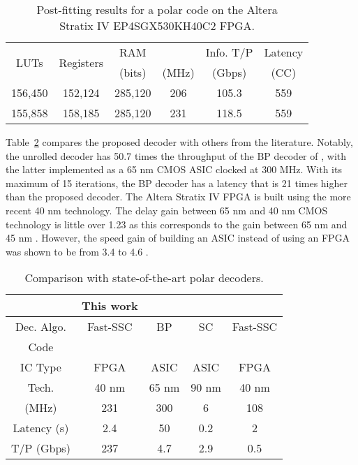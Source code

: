 \documentclass[letterpaper,onecolumn,journal,12pt]{IEEEtran}
\begin{document}
\begin{table}[h]
  \centering
  \caption{Post-fitting results for a  polar code on the Altera\\ Stratix IV EP4SGX530KH40C2 FPGA.}
  \begin{tabular}{c c c c c c}
    \toprule
    \multicolumn{1}{c}{\multirow{2}{*}{LUTs}} & \multicolumn{1}{c}{\multirow{2}{*}{Registers}} & \multicolumn{1}{c}{RAM} &  & Info. T/P & Latency\\
    & & \multicolumn{1}{c}{(bits)} & (MHz) & (Gbps) & (CC)\\
    \midrule
    156,450 & 152,124 & 285,120 & 206 & 105.3 & 559\\
    155,858 & 158,185 & 285,120 & 231 & 118.5 & 559\\
    \bottomrule
  \end{tabular}
  \label{tab:unrolled_results}
\end{table}

Table~\ref{tab:cmp_results} compares the proposed decoder with others from the literature. Notably, the unrolled decoder has 50.7 times the throughput of the BP decoder of \cite{Park2014}, with the latter implemented as a 65 nm CMOS ASIC clocked at 300 MHz. With its maximum of 15 iterations, the BP decoder has a latency that is 21 times higher than the proposed decoder. The Altera Stratix IV FPGA is built using the more recent 40 nm technology. The delay gain between 65 nm and 40 nm CMOS technology is little over 1.23 as this corresponds to the gain between 65 nm and 45 nm \cite{Wong2011}. However, the speed gain of building an ASIC instead of using an FPGA was shown to be from 3.4 to 4.6 \cite{Kuon2007}.

\begin{table}[h]
  \centering
  \caption{Comparison with state-of-the-art polar decoders.}
  \begin{tabular}{c c c c c}
    \toprule
                 & This work & \cite{Park2014} & \cite{Dizdar2014} & \cite{Sarkis2014}\\
    \midrule
    Dec. Algo.   & Fast-SSC  & BP              & SC                & Fast-SSC\\
    Code         &  &  &          & \\
    IC Type      & FPGA      & ASIC            & ASIC              & FPGA\\
    Tech.        & 40 nm     & 65 nm           & 90 nm             & 40 nm\\
     (MHz)    & 231       & 300             & 6                 & 108\\
    Latency (s) & 2.4   & 50              & 0.2               & 2\\
    T/P (Gbps)   & 237       & 4.7             & 2.9               & 0.5\\
    \bottomrule
  \end{tabular}
  \label{tab:cmp_results}
\end{table}
\end{document}
